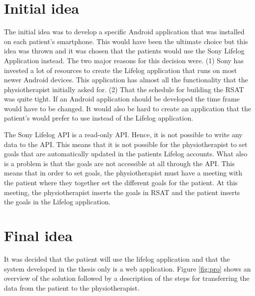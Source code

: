 \documentclass{cslthse-msc}
\begin{document}
\section{Initial idea}
The initial idea was to develop a specific Android application that was installed on each patient’s smartphone. This would have been the ultimate choice but this idea was thrown and it was chosen that the patients would use the Sony Lifelog Application instead. The two major reasons for this decision were. 
(1) Sony has invested a lot of resources to create the Lifelog application that runs on most newer Android devices. This application has almost all the functionality that the physiotherapist initially asked for.
(2) That the schedule for building the RSAT was quite tight. If an Android application should be developed the time frame would have to be changed. It would also be hard to create an application that the patient’s would prefer to use instead of the Lifelog application.

The Sony Lifelog API is a read-only API. Hence, it is not possible to write any data to the API. This means that it is not possible for the physiotherapist to set goals that are automatically updated in the patients Lifelog accounts. What also is a problem is that the goals are not accessible at all through the API. This means that in order to set goals, the physiotherapist must have a meeting with the patient where they together set the different goals for the patient. At this meeting, the physiotherapist inserts the goals in RSAT and the patient inserts the goals in the Lifelog application. 

\section{Final idea}
\label{sec:proposed-solution}
It was decided that the patient will use the lifelog application and that the system developed in the thesis only is a web application. 
Figure \ref{fig:pro} shows an overview of the solution followed by a description of the steps for transferring the data from the patient to the physiotherapist.
\end{document}
